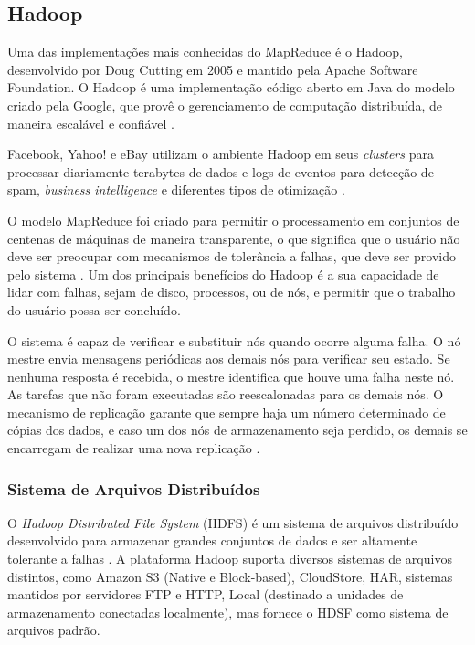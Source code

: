 \subsection{Hadoop}
Uma das implementações mais conhecidas do MapReduce é o Hadoop, desenvolvido por Doug Cutting em 2005 e mantido pela Apache Software Foundation. O Hadoop é uma implementação código aberto em Java do modelo criado pela Google, que provê o gerenciamento de computação distribuída, de maneira escalável e confiável \cite{Hadoop:2010}.

Facebook, Yahoo! e eBay utilizam o ambiente Hadoop em seus \textit{clusters} para processar diariamente terabytes de dados e logs de eventos para detecção de spam, \textit{business intelligence} e diferentes tipos de otimização \cite{Cherkasova:2011}.

O modelo MapReduce foi criado para permitir o processamento em conjuntos de centenas de máquinas de maneira transparente, o que significa que o usuário não deve ser preocupar com mecanismos de tolerância a falhas, que deve ser provido pelo sistema \cite{Dean:2008}. 
Um dos principais benefícios do Hadoop é a sua capacidade de lidar com falhas, sejam de disco, processos, ou de nós, e permitir que o trabalho do usuário possa ser concluído.

O sistema é capaz de verificar e substituir nós quando ocorre alguma falha. O nó mestre envia mensagens periódicas aos demais nós para verificar seu estado. Se nenhuma resposta é recebida, o mestre identifica que houve uma falha neste nó. 
As tarefas que não foram executadas são reescalonadas para os demais nós. O mecanismo de replicação garante que sempre haja um número determinado de cópias dos dados, e caso um dos nós de armazenamento seja perdido, os demais se encarregam de realizar uma nova replicação \cite{Hadoop:2010}.



\subsubsection{Sistema de Arquivos Distribuídos}


O \textit{ Hadoop Distributed File System} (HDFS) é um sistema de arquivos distribuído desenvolvido para armazenar grandes conjuntos de dados e ser altamente tolerante a falhas \cite{Hadoop:2010}.
A plataforma Hadoop suporta diversos sistemas de arquivos distintos, como Amazon S3 (Native e Block-based), CloudStore, HAR, sistemas mantidos por servidores FTP e HTTP, Local (destinado a unidades de armazenamento conectadas localmente), mas fornece o HDSF como sistema de arquivos padrão.

